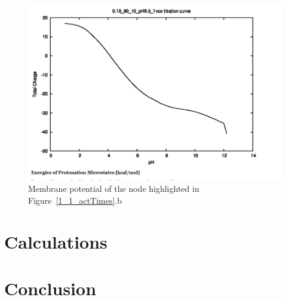 \documentclass[12pt]{article}
\begin{document}
\begin{figure}[H]
	\centering
	\includegraphics[width=.95\linewidth]{ComputedTitration.png}
	
	\caption{Membrane potential of the node highlighted in Figure~\ref{1_1_actTimes}.b}
	\label{titration}
\end{figure}
\section{Calculations}



\section{Conclusion}


%
%
\end{document}
